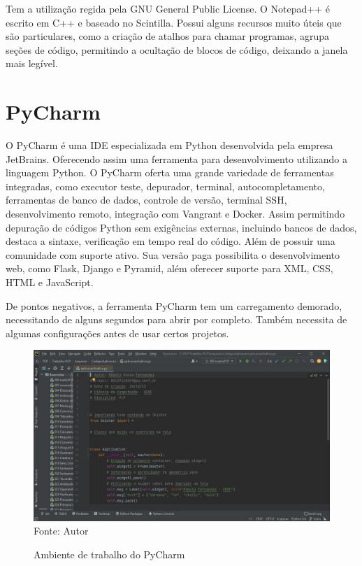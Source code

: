 		
	Tem a utilização regida pela GNU General Public License. O Notepad++ é escrito em C++ e baseado no Scintilla. Possui alguns recursos muito úteis que são particulares, como a criação de atalhos para chamar programas, agrupa seções de código, permitindo a ocultação de blocos de código, deixando a janela mais legível.
	
    \section{PyCharm}
    O PyCharm é uma IDE especializada em Python desenvolvida pela empresa JetBrains. Oferecendo assim uma ferramenta para desenvolvimento utilizando a linguagem Python. 
    O PyCharm oferta uma grande variedade de ferramentas integradas, como executor teste, depurador, terminal, autocompletamento, ferramentas de banco de dados, controle de versão, terminal SSH, desenvolvimento remoto, integração com Vangrant e Docker.
    Assim permitindo depuração de códigos Python sem exigências externas, incluindo bancos de dados, destaca a sintaxe, verificação em tempo real do código. Além de possuir uma comunidade com suporte ativo. Sua versão paga possibilita o desenvolvimento web, como Flask, Django e Pyramid, além oferecer suporte para XML, CSS, HTML e JavaScript.
    
    De pontos negativos, a ferramenta PyCharm tem um carregamento demorado, necessitando de alguns segundos para abrir por completo. Também necessita de algumas configurações antes de usar certos projetos.
    
    
    \begin{figure}[H]
    	\begin{center}
    		\caption{Ambiente de trabalho do PyCharm} \label{ling1}
    		\includegraphics[width=15cm]{pycharm.JPG} \\
    		{\tiny \sf Fonte:{ Autor}}
    	\end{center}
    \end{figure}
    
